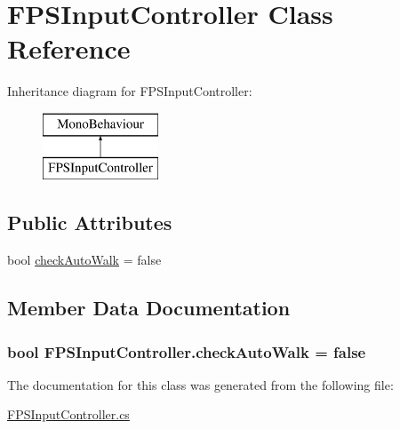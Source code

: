\hypertarget{class_f_p_s_input_controller}{}\section{F\+P\+S\+Input\+Controller Class Reference}
\label{class_f_p_s_input_controller}
Inheritance diagram for F\+P\+S\+Input\+Controller\+:\begin{figure}[H]
\begin{center}
\leavevmode
\includegraphics[height=2.000000cm]{class_f_p_s_input_controller}
\end{center}
\end{figure}
\subsection*{Public Attributes}
\begin{DoxyCompactItemize}
\item 
bool \hyperlink{class_f_p_s_input_controller_a9e52965685f8d0253de430b56d0359e9}{check\+Auto\+Walk} = false
\end{DoxyCompactItemize}


\subsection{Member Data Documentation}
\hypertarget{class_f_p_s_input_controller_a9e52965685f8d0253de430b56d0359e9}{}
\subsubsection[{check\+Auto\+Walk}]{\setlength{\rightskip}{0pt plus 5cm}bool F\+P\+S\+Input\+Controller.\+check\+Auto\+Walk = false}\label{class_f_p_s_input_controller_a9e52965685f8d0253de430b56d0359e9}


The documentation for this class was generated from the following file\+:\begin{DoxyCompactItemize}
\item 
\hyperlink{_f_p_s_input_controller_8cs}{F\+P\+S\+Input\+Controller.\+cs}\end{DoxyCompactItemize}
